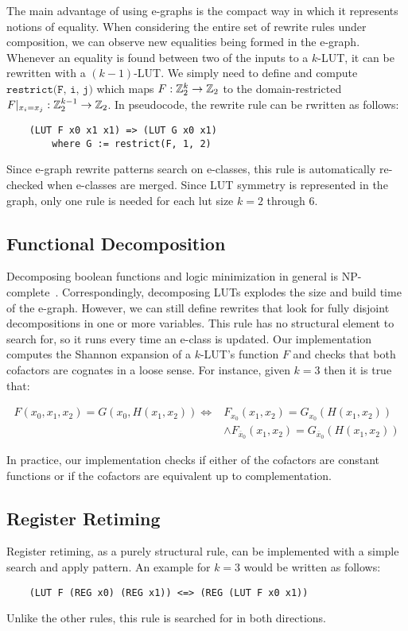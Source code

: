 The main advantage of using e-graphs is the compact way in which it represents
notions of equality. When considering the entire set of rewrite rules under
composition, we can observe new equalities being formed in the e-graph.
Whenever an equality is found between two of the inputs to a $k$-LUT, it can be
rewritten with a $(k-1)$-LUT. We simply need to define and compute
$\texttt{restrict(F, i, j)}$ which maps $F : \mathbb{Z}_{2}^{k} \rightarrow \mathbb{Z}_{2}$ to the
domain-restricted $F \vert_{x_i = x_j} : \mathbb{Z}_{2}^{k-1} \rightarrow \mathbb{Z}_{2}$. In
pseudocode, the rewrite rule can be rwritten as follows:

\begin{verbatim}
    (LUT F x0 x1 x1) => (LUT G x0 x1)
        where G := restrict(F, 1, 2)
\end{verbatim}

Since e-graph rewrite patterns search on e-classes, this rule is automatically
re-checked when e-classes are merged. Since LUT symmetry is represented in the
graph, only one rule is needed for each lut size $k=2$ through 6.

\subsection{Functional Decomposition}\label{sec:rewrites:decomp}

Decomposing boolean functions and logic minimization in general is
NP-complete~\cite{logicmin}. Correspondingly, decomposing LUTs explodes the
size and build time of the e-graph. However, we can still define rewrites that
look for fully disjoint decompositions in one or more variables. This rule has
no structural element to search for, so it runs every time an e-class is
updated. Our implementation computes the Shannon expansion of a $k$-LUT's
function $F$ and checks that both cofactors are cognates in a loose sense. For
instance, given $k=3$ then it is true that:

\begin{align*}
    F(x_0, x_1, x_2) = G(x_0, H(x_1, x_2)) \iff & F_{x_0} (x_1, x_2) = G_{x_0} (H(x_1, x_2))                             \\
                                                & \land F_{\overline{x}_0} (x_1, x_2) = G_{\overline{x}_0} (H(x_1, x_2))
\end{align*}

In practice, our implementation checks if either of the cofactors are constant
functions or if the cofactors are equivalent up to complementation.

\subsection{Register Retiming}\label{sec:rewrites:retiming}
Register retiming, as a purely structural rule, can be implemented with a
simple search and apply pattern. An example for $k=3$ would be written as
follows:

\begin{verbatim}
    (LUT F (REG x0) (REG x1)) <=> (REG (LUT F x0 x1))
\end{verbatim}

Unlike the other rules, this rule is searched for in both directions.